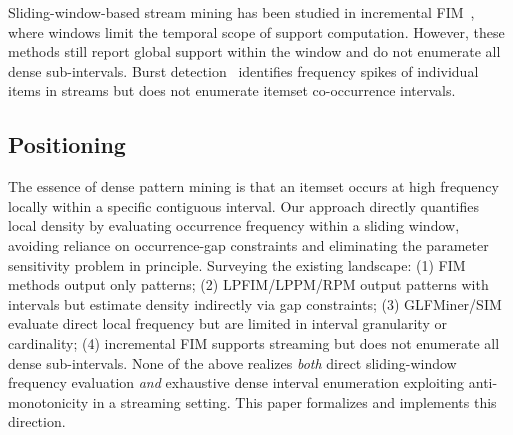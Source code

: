 Sliding-window-based stream mining has been studied in
incremental FIM~\cite{lee2001sliding,leung2006dstree},
where windows limit the temporal scope of support computation.
However, these methods still report global support within the window
and do not enumerate all dense sub-intervals.
Burst detection~\cite{kleinberg2003bursty,yang2021burstsketch} identifies
frequency spikes of individual items in streams but does not enumerate
itemset co-occurrence intervals.

\subsection{Positioning}

The essence of dense pattern mining is that an itemset occurs at
high frequency locally within a specific contiguous interval.
Our approach directly quantifies local density by evaluating
occurrence frequency within a sliding window, avoiding reliance
on occurrence-gap constraints and eliminating the parameter
sensitivity problem in principle.
Surveying the existing landscape: (1) FIM methods output only
patterns; (2) LPFIM/LPPM/RPM output patterns with intervals but
estimate density indirectly via gap constraints; (3) GLFMiner/SIM
evaluate direct local frequency but are limited in interval granularity
or cardinality; (4) incremental FIM supports streaming but does not
enumerate all dense sub-intervals.
None of the above realizes \textit{both} direct sliding-window
frequency evaluation \textit{and} exhaustive dense interval
enumeration exploiting anti-monotonicity in a streaming setting.
This paper formalizes and implements this direction.
